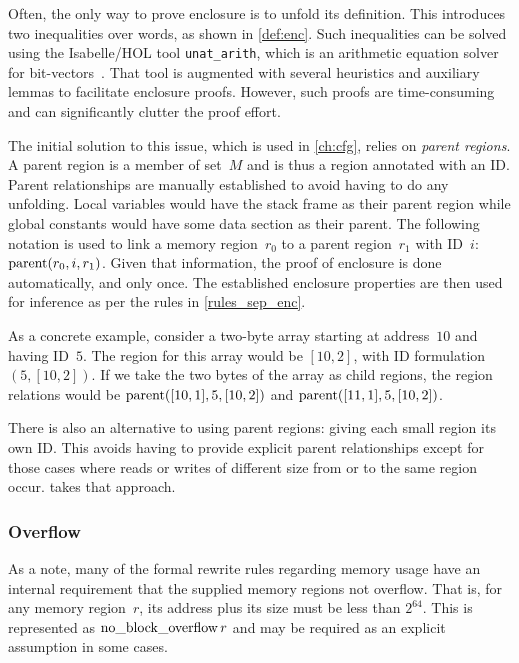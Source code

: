 Often, the only way to prove enclosure is to unfold its definition.
This introduces two inequalities over words, as shown in \cref{def:enc}.
Such inequalities can be solved using the Isabelle/HOL tool \lstinline{unat_arith}, which is an arithmetic equation solver for bit-vectors~\citep{dawson2009isabelle}.
That tool is augmented with several heuristics
and auxiliary lemmas to facilitate enclosure proofs.
However, such proofs are time-consuming
and can significantly clutter the proof effort.

The initial solution to this issue, which is used in \cref{ch:cfg},
relies on \emph{parent regions}.%
A parent region is a member of set~$M$ and is thus a region annotated with an ID.
Parent relationships are manually established to avoid having to do any unfolding.
Local variables would have the stack frame as their parent region
while global constants would have some data section as their parent.
The following notation is used to link a memory region~$r_0$
to a parent region~$r_1$ with ID~$i$: $\operatorname{parent}(r_0,i,r_1)$.
Given that information, the proof of enclosure is done automatically, and only once.
The established enclosure properties are then used for inference
as per the rules in \cref{rules_sep_enc}.

As a concrete example, consider a two-byte array starting at address~$10$
and having ID~$5$.
The region for this array would be $[10, 2]$, with ID formulation $(5, [10, 2])$.
If we take the two bytes of the array as child regions,
the region relations would be $\operatorname{parent}([10, 1],5,[10, 2])$
and $\operatorname{parent}([11, 1],5,[10, 2])$.

There is also an alternative to using parent regions:
giving each small region its own ID.
This avoids having to provide explicit parent relationships
except for those cases where reads or writes of different size
from or to the same region occur.
 takes that approach.

\subsubsection{Overflow}
As a note, many of the formal rewrite rules regarding memory usage
have an internal requirement that the supplied memory regions not overflow.
That is, for any memory region~$r$,
its address plus its size must be less than $2^{64}$.
This is represented as $\operatorname{no\_block\_overflow} r$ and may be required as an explicit assumption
in some cases.

